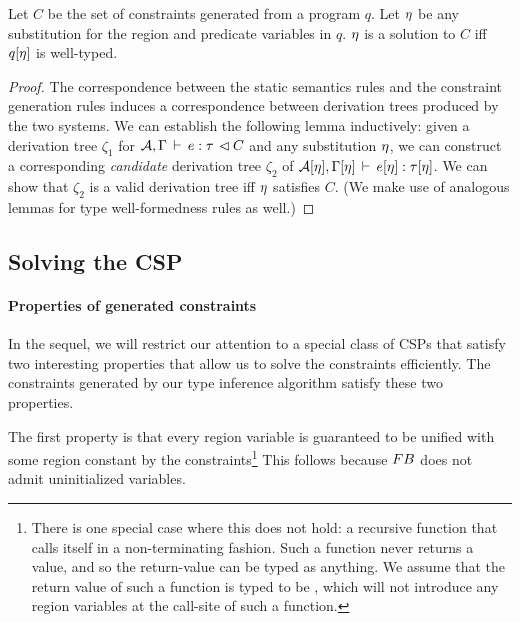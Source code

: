 \begin{theorem}
  \label{thm:constraint-generation-sc}
Let $C$ be the set of constraints generated from a program $q$.
Let $\eta$ be any substitution for the region and predicate variables in $q$.
$\eta$ is a solution to $C$ iff $q[\eta]$ is well-typed.
\end{theorem}
\begin{proof}
The correspondence between the static semantics rules and the constraint generation
rules induces a correspondence between derivation trees produced by the
two systems.
We can establish the following lemma inductively:
given a derivation tree $\zeta_1$ for
${{\mathcal{A}},\Gamma} \, \vdash \, {e} : {\tau} \, \lhd {C}$
and any substitution $\eta$,
we can construct a corresponding \emph{candidate} derivation
tree $\zeta_2$ of ${\mathcal{A}}[\eta],\Gamma[\eta]\,\vdash\,e[\eta]:\tau[\eta]$.
We can show that $\zeta_2$ is a valid derivation tree iff $\eta$ satisfies $C$.
(We make use of analogous lemmas for type well-formedness rules as well.)
\end{proof}

\subsection{Solving the CSP}

\paragraph{Properties of generated constraints}
In the sequel, we will restrict our attention to a special class of CSPs that satisfy
two interesting properties that allow us to solve the constraints efficiently.
The constraints generated by our type inference algorithm satisfy these two properties.

The first property is that every region variable is guaranteed to be unified with some
region constant by the constraints\footnote{
There is one special case where this does not hold: a recursive function
that calls itself in a non-terminating fashion. Such a function never
returns a value, and so the return-value can be typed as anything.
We assume that the return value of such a function is typed to be ,
which will not introduce any region variables at the call-site of such a function.}
This follows because ${\sc FB}$ does not admit uninitialized variables.

